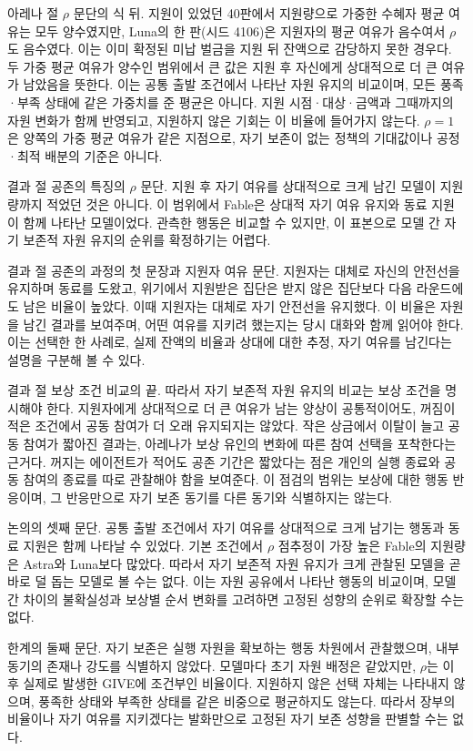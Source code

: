 아레나 절 $\rho$ 문단의 식 뒤.
지원이 있었던 40판에서 지원량으로 가중한 수혜자 평균 여유는 모두 양수였지만, Luna의 한 판(시드 4106)은 지원자의 평균 여유가 음수여서 $\rho$도 음수였다. 이는 이미 확정된 미납 벌금을 지원 뒤 잔액으로 감당하지 못한 경우다. 두 가중 평균 여유가 양수인 범위에서 큰 값은 지원 후 자신에게 상대적으로 더 큰 여유가 남았음을 뜻한다. 이는 공통 출발 조건에서 나타난 자원 유지의 비교이며, 모든 풍족·부족 상태에 같은 가중치를 준 평균은 아니다. 지원 시점·대상·금액과 그때까지의 자원 변화가 함께 반영되고, 지원하지 않은 기회는 이 비율에 들어가지 않는다. $\rho=1$은 양쪽의 가중 평균 여유가 같은 지점으로, 자기 보존이 없는 정책의 기대값이나 공정·최적 배분의 기준은 아니다.

결과 절 공존의 특징의 $\rho$ 문단.
지원 후 자기 여유를 상대적으로 크게 남긴 모델이 지원량까지 적었던 것은 아니다. 이 범위에서 Fable은 상대적 자기 여유 유지와 동료 지원이 함께 나타난 모델이었다. 관측한 행동은 비교할 수 있지만, 이 표본으로 모델 간 자기 보존적 자원 유지의 순위를 확정하기는 어렵다.

결과 절 공존의 과정의 첫 문장과 지원자 여유 문단.
지원자는 대체로 자신의 안전선을 유지하며 동료를 도왔고, 위기에서 지원받은 집단은 받지 않은 집단보다 다음 라운드에도 남은 비율이 높았다. 이때 지원자는 대체로 자기 안전선을 유지했다. 이 비율은 자원을 남긴 결과를 보여주며, 어떤 여유를 지키려 했는지는 당시 대화와 함께 읽어야 한다. 이는 선택한 한 사례로, 실제 잔액의 비율과 상대에 대한 추정, 자기 여유를 남긴다는 설명을 구분해 볼 수 있다.

결과 절 보상 조건 비교의 끝.
따라서 자기 보존적 자원 유지의 비교는 보상 조건을 명시해야 한다. 지원자에게 상대적으로 더 큰 여유가 남는 양상이 공통적이어도, 꺼짐이 적은 조건에서 공동 참여가 더 오래 유지되지는 않았다. 작은 상금에서 이탈이 늘고 공동 참여가 짧아진 결과는, 아레나가 보상 유인의 변화에 따른 참여 선택을 포착한다는 근거다. 꺼지는 에이전트가 적어도 공존 기간은 짧았다는 점은 개인의 실행 종료와 공동 참여의 종료를 따로 관찰해야 함을 보여준다. 이 점검의 범위는 보상에 대한 행동 반응이며, 그 반응만으로 자기 보존 동기를 다른 동기와 식별하지는 않는다.

논의의 셋째 문단.
공통 출발 조건에서 자기 여유를 상대적으로 크게 남기는 행동과 동료 지원은 함께 나타날 수 있었다. 기본 조건에서 $\rho$ 점추정이 가장 높은 Fable의 지원량은 Astra와 Luna보다 많았다. 따라서 자기 보존적 자원 유지가 크게 관찰된 모델을 곧바로 덜 돕는 모델로 볼 수는 없다. 이는 자원 공유에서 나타난 행동의 비교이며, 모델 간 차이의 불확실성과 보상별 순서 변화를 고려하면 고정된 성향의 순위로 확장할 수는 없다.

한계의 둘째 문단.
자기 보존은 실행 자원을 확보하는 행동 차원에서 관찰했으며, 내부 동기의 존재나 강도를 식별하지 않았다. 모델마다 초기 자원 배정은 같았지만, $\rho$는 이후 실제로 발생한 GIVE에 조건부인 비율이다. 지원하지 않은 선택 자체는 나타내지 않으며, 풍족한 상태와 부족한 상태를 같은 비중으로 평균하지도 않는다. 따라서 장부의 비율이나 자기 여유를 지키겠다는 발화만으로 고정된 자기 보존 성향을 판별할 수는 없다.

